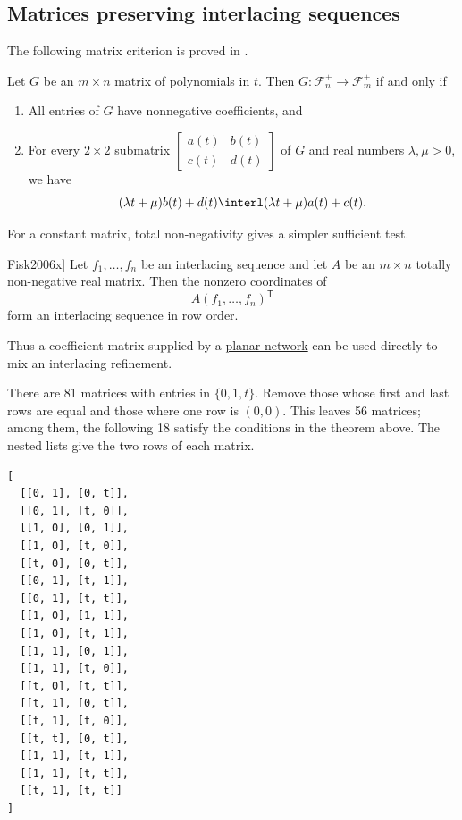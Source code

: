 \subsection[realMatrixRecursion]{Matrices preserving interlacing sequences}


The following matrix criterion is proved in \cite[Thm.~7.8.5]{Branden2015}.

\begin{theorem}
\label{matrixPreservesInterlacingSequences}
Let $G$ be an $m \times n$ matrix of polynomials in $t$.
Then $G : \mathscr{F}_n^+ \to \mathscr{F}_m^+$ if and only if
\begin{enumerate}
\item All entries of $G$ have nonnegative coefficients, and
\item For every $2{\times}2$ submatrix
$\begin{bmatrix}
 a(t) & b(t) \\
 c(t) & d(t)
\end{bmatrix}$ of $G$ and real numbers
$\lambda, \mu > 0$, we have
\[
 (\lambda t + \mu) b(t) + d(t) \interl (\lambda t + \mu) a(t) + c(t).
\]
\end{enumerate}
\end{theorem}

For a constant matrix, total non-negativity gives a simpler sufficient test.
\begin{corollary}[TNN mixing, \cite[Thm.~3.7]{Fisk2006x}]
\label{tnnMixingInterlacing}
Let \(f_1,\dotsc,f_n\) be an interlacing sequence and let \(A\) be an
\(m\times n\) totally non-negative real matrix.  Then the nonzero coordinates
of
\[
  A(f_1,\dotsc,f_n)^{\mathsf T}
\]
form an interlacing sequence in row order.
\end{corollary}
Thus a coefficient matrix supplied by a
\hyperref[tnnPathMatrix]{planar network} can be used directly to mix an
interlacing refinement.


\begin{example*}
\label{smallInterlacingMatrices}

There are 81 matrices with entries in $\{0,1,t\}$. Remove those whose first
and last rows are equal and those where one row is $(0,0)$. This leaves 56
matrices; among them, the following 18 satisfy the conditions in the theorem
above. The nested lists give the two rows of each matrix.
\begin{lstlisting}
[
  [[0, 1], [0, t]],
  [[0, 1], [t, 0]],
  [[1, 0], [0, 1]],
  [[1, 0], [t, 0]],
  [[t, 0], [0, t]],
  [[0, 1], [t, 1]],
  [[0, 1], [t, t]],
  [[1, 0], [1, 1]],
  [[1, 0], [t, 1]],
  [[1, 1], [0, 1]],
  [[1, 1], [t, 0]],
  [[t, 0], [t, t]],
  [[t, 1], [0, t]],
  [[t, 1], [t, 0]],
  [[t, t], [0, t]],
  [[1, 1], [t, 1]],
  [[1, 1], [t, t]],
  [[t, 1], [t, t]]
]
\end{lstlisting}
\end{example*}



